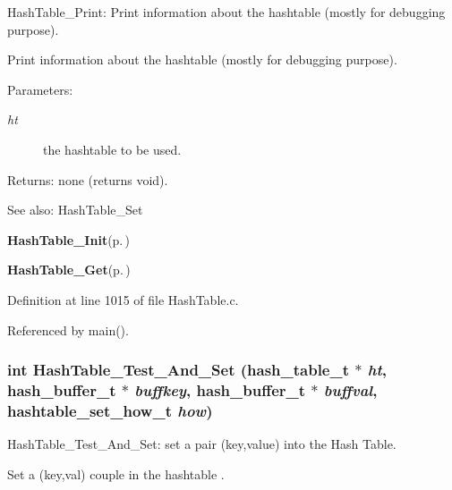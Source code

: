 Hash\-Table\_\-Print: Print information about the hashtable (mostly for debugging purpose).

Print information about the hashtable (mostly for debugging purpose).

\begin{Desc}
\item[Parameters:]
\begin{description}
\item[{\em ht}]the hashtable to be used.\end{description}
\end{Desc}
\begin{Desc}
\item[Returns:]none (returns void).\end{Desc}
\begin{Desc}
\item[See also:]Hash\-Table\_\-Set 

{\bf Hash\-Table\_\-Init}{\rm (p.\,\pageref{group__HashTableExportedFunctions_ga0})} 

{\bf Hash\-Table\_\-Get}{\rm (p.\,\pageref{group__HashTableExportedFunctions_ga2})} \end{Desc}


Definition at line 1015 of file Hash\-Table.c.

Referenced by main().
\subsubsection{\setlength{\rightskip}{0pt plus 5cm}int Hash\-Table\_\-Test\_\-And\_\-Set (hash\_\-table\_\-t $\ast$ {\em ht}, hash\_\-buffer\_\-t $\ast$ {\em buffkey}, hash\_\-buffer\_\-t $\ast$ {\em buffval}, hashtable\_\-set\_\-how\_\-t {\em how})}\label{group__HashTableExportedFunctions_ga1}


Hash\-Table\_\-Test\_\-And\_\-Set: set a pair (key,value) into the Hash Table.

Set a (key,val) couple in the hashtable .

